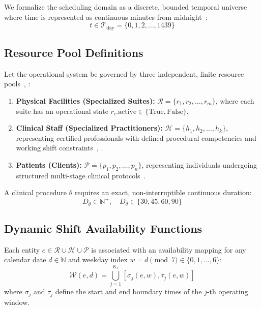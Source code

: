 \documentclass[conference]{IEEEtran}
\begin{document}
We formalize the scheduling domain as a discrete, bounded temporal universe where time is represented as continuous minutes from midnight~\cite{allen1983maintaining}:
\begin{equation}
t \in \mathcal{T}_{\text{day}} = \{0, 1, 2, \dots, 1439\}
\end{equation}

\subsection{Resource Pool Definitions}
Let the operational system be governed by three independent, finite resource pools~\cite{gupta2008appointment}, \cite{vanessen2014breaking}:
\begin{enumerate}
    \item \textbf{Physical Facilities (Specialized Suites):} $\mathcal{R} = \{r_1, r_2, \dots, r_m\}$, where each suite has an operational state $r_i.\text{active} \in \{\text{True}, \text{False}\}$.
    \item \textbf{Clinical Staff (Specialized Practitioners):} $\mathcal{H} = \{h_1, h_2, \dots, h_k\}$, representing certified professionals with defined procedural competencies and working shift constraints~\cite{schimmelpfeng2021operating}, \cite{gaggero2021decision}.
    \item \textbf{Patients (Clients):} $\mathcal{P} = \{p_1, p_2, \dots, p_n\}$, representing individuals undergoing structured multi-stage clinical protocols~\cite{singh2008holistic}.
\end{enumerate}

A clinical procedure $\theta$ requires an exact, non-interruptible continuous duration:
\begin{equation}
D_{\theta} \in \mathbb{N}^+, \quad D_{\theta} \in \{30, 45, 60, 90\}
\end{equation}

\subsection{Dynamic Shift Availability Functions}
Each entity $e \in \mathcal{R} \cup \mathcal{H} \cup \mathcal{P}$ is associated with an availability mapping for any calendar date $d \in \mathbb{N}$ and weekday index $w = d \pmod 7 \in \{0, 1, \dots, 6\}$:
\begin{equation}
\mathcal{W}(e, d) = \bigcup_{j=1}^{K_e} \left[ \sigma_j(e, w), \tau_j(e, w) \right]
\end{equation}
where $\sigma_j$ and $\tau_j$ define the start and end boundary times of the $j$-th operating window.
\end{document}
